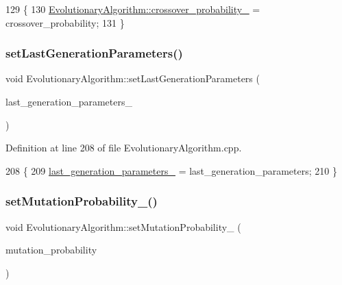 \begin{DoxyCode}
129                                                                                  \{
130     \hyperlink{classEvolutionaryAlgorithm_a815be8b2644e2d1bdc6378c88ab03da3}{EvolutionaryAlgorithm::crossover\_probability\_} = 
      crossover\_probability;
131 \}
\end{DoxyCode}
\mbox{\label{classEvolutionaryAlgorithm_accd59515cc111edb66a030e7f8d79099}} 
\subsubsection{\texorpdfstring{set\+Last\+Generation\+Parameters()}{setLastGenerationParameters()}}
{\footnotesize\ttfamily void Evolutionary\+Algorithm\+::set\+Last\+Generation\+Parameters (\begin{DoxyParamCaption}\item[{const std\+::vector$<$ \hyperlink{classCarParameters}{Car\+Parameters} $>$ \&}]{last\+\_\+generation\+\_\+parameters\+\_\+ }\end{DoxyParamCaption})}



Definition at line 208 of file Evolutionary\+Algorithm.\+cpp.


\begin{DoxyCode}
208                                                                                                            
             \{
209     \hyperlink{classEvolutionaryAlgorithm_a85d23b07f2b2c8b1df581a9566111fa7}{last\_generation\_parameters\_} = last\_generation\_parameters;
210 \}
\end{DoxyCode}
\mbox{\label{classEvolutionaryAlgorithm_a2f47cbcc3c2b886ece5ba97bbfed4178}} 
\subsubsection{\texorpdfstring{set\+Mutation\+Probability\+\_\+()}{setMutationProbability\_()}}
{\footnotesize\ttfamily void Evolutionary\+Algorithm\+::set\+Mutation\+Probability\+\_\+ (\begin{DoxyParamCaption}\item[{double}]{mutation\+\_\+probability }\end{DoxyParamCaption})}



